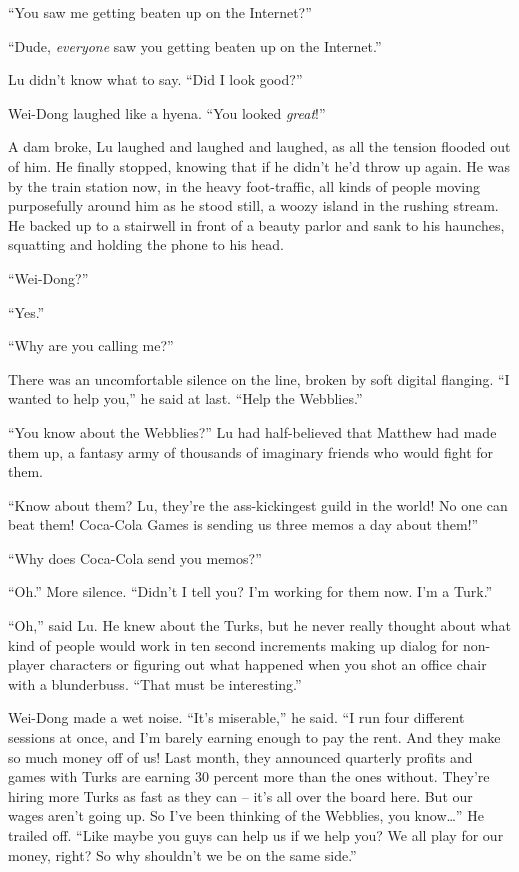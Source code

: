 ``You saw me getting beaten up on the Internet?''

``Dude, \emph{everyone} saw you getting beaten up on the Internet.''

Lu didn't know what to say. ``Did I look good?''

Wei-Dong laughed like a hyena. ``You looked \emph{great}!''

A dam broke, Lu laughed and laughed and laughed, as all the tension
flooded out of him. He finally stopped, knowing that if he didn't
he'd throw up again. He was by the train station now, in the heavy
foot-traffic, all kinds of people moving purposefully around him as
he stood still, a woozy island in the rushing stream. He backed up
to a stairwell in front of a beauty parlor and sank to his
haunches, squatting and holding the phone to his head.

``Wei-Dong?''

``Yes.''

``Why are you calling me?''

There was an uncomfortable silence on the line, broken by soft
digital flanging. ``I wanted to help you,'' he said at last. ``Help
the Webblies.''

``You know about the Webblies?'' Lu had half-believed that Matthew
had made them up, a fantasy army of thousands of imaginary friends
who would fight for them.

``Know about them? Lu, they're the ass-kickingest guild in the
world! No one can beat them! Coca-Cola Games is sending us three
memos a day about them!''

``Why does Coca-Cola send you memos?''

``Oh.'' More silence. ``Didn't I tell you? I'm working for them now.
I'm a Turk.''

``Oh,'' said Lu. He knew about the Turks, but he never really thought
about what kind of people would work in ten second increments
making up dialog for non-player characters or figuring out what
happened when you shot an office chair with a blunderbuss. ``That
must be interesting.''

Wei-Dong made a wet noise. ``It's miserable,'' he said. ``I run four
different sessions at once, and I'm barely earning enough to pay
the rent. And they make so much money off of us! Last month, they
announced quarterly profits and games with Turks are earning 30
percent more than the ones without. They're hiring more Turks as
fast as they can -- it's all over the board here. But our wages
aren't going up. So I've been thinking of the Webblies, you
know\ldots{}'' He trailed off. ``Like maybe you guys can help us if we
help you? We all play for our money, right? So why shouldn't we be
on the same side.''

